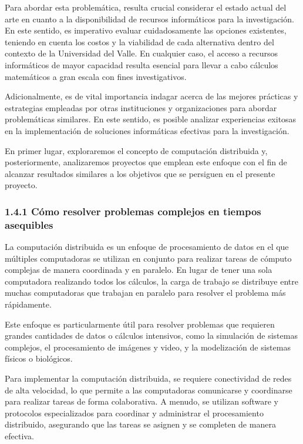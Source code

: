 \begin{spacing}{1.5}
  Para abordar esta problemática, resulta crucial considerar el estado actual del arte en cuanto a la disponibilidad de recursos informáticos para la investigación. En este sentido, es imperativo evaluar cuidadosamente las opciones existentes, teniendo en cuenta los costos y la viabilidad de cada alternativa dentro del contexto de la Universidad del Valle. En cualquier caso, el acceso a recursos informáticos de mayor capacidad resulta esencial para llevar a cabo cálculos matemáticos a gran escala con fines investigativos.

  Adicionalmente, es de vital importancia indagar acerca de las mejores prácticas y estrategias empleadas por otras instituciones y organizaciones para abordar problemáticas similares. En este sentido, es posible analizar experiencias exitosas en la implementación de soluciones informáticas efectivas para la investigación.

  En primer lugar, exploraremos el concepto de computación distribuida y, posteriormente, analizaremos proyectos que emplean este enfoque con el fin de alcanzar resultados similares a los objetivos que se persiguen en el presente proyecto.

  \subsubsection{1.4.1 Cómo resolver problemas complejos en tiempos asequibles}

  La computación distribuida es un enfoque de procesamiento de datos en el que múltiples computadoras se utilizan en conjunto para realizar tareas de cómputo complejas de manera coordinada y en paralelo. En lugar de tener una sola computadora realizando todos los cálculos, la carga de trabajo se distribuye entre muchas computadoras que trabajan en paralelo para resolver el problema más rápidamente.

  Este enfoque es particularmente útil para resolver problemas que requieren grandes cantidades de datos o cálculos intensivos, como la simulación de sistemas complejos, el procesamiento de imágenes y video, y la modelización de sistemas físicos o biológicos.

  Para implementar la computación distribuida, se requiere conectividad de redes de alta velocidad, lo que permite a las computadoras comunicarse y coordinarse para realizar tareas de forma colaborativa. A menudo, se utilizan software y protocolos especializados para coordinar y administrar el procesamiento distribuido, asegurando que las tareas se asignen y se completen de manera efectiva.


\end{spacing}
